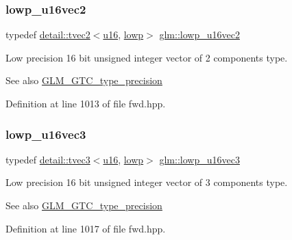 \subsubsection{\texorpdfstring{lowp\+\_\+u16vec2}{lowp\_u16vec2}}
{\footnotesize\ttfamily typedef \hyperlink{structglm_1_1detail_1_1tvec2}{detail\+::tvec2}$<$\hyperlink{group__gtc__type__precision_gae7a1571503f83d2264ddfa705a6b082a}{u16}, \hyperlink{namespaceglm_a0f04f086094c747d227af4425893f545ae161af3fc695e696ce3bf69f7332bc2d}{lowp}$>$ \hyperlink{group__gtc__type__precision_gaff5ca5a8bc621bb8f4b28f046c0de508}{glm\+::lowp\+\_\+u16vec2}}

Low precision 16 bit unsigned integer vector of 2 components type. \begin{DoxySeeAlso}{See also}
\hyperlink{group__gtc__type__precision}{G\+L\+M\+\_\+\+G\+T\+C\+\_\+type\+\_\+precision} 
\end{DoxySeeAlso}


Definition at line 1013 of file fwd.\+hpp.

\mbox{\label{group__gtc__type__precision_ga74d5491c9ee66d068309d200601e907b}} 
\subsubsection{\texorpdfstring{lowp\+\_\+u16vec3}{lowp\_u16vec3}}
{\footnotesize\ttfamily typedef \hyperlink{structglm_1_1detail_1_1tvec3}{detail\+::tvec3}$<$\hyperlink{group__gtc__type__precision_gae7a1571503f83d2264ddfa705a6b082a}{u16}, \hyperlink{namespaceglm_a0f04f086094c747d227af4425893f545ae161af3fc695e696ce3bf69f7332bc2d}{lowp}$>$ \hyperlink{group__gtc__type__precision_ga74d5491c9ee66d068309d200601e907b}{glm\+::lowp\+\_\+u16vec3}}

Low precision 16 bit unsigned integer vector of 3 components type. \begin{DoxySeeAlso}{See also}
\hyperlink{group__gtc__type__precision}{G\+L\+M\+\_\+\+G\+T\+C\+\_\+type\+\_\+precision} 
\end{DoxySeeAlso}


Definition at line 1017 of file fwd.\+hpp.

\mbox{\label{group__gtc__type__precision_gab0210f390e7d75fa8eb42128a05ff23a}} 
